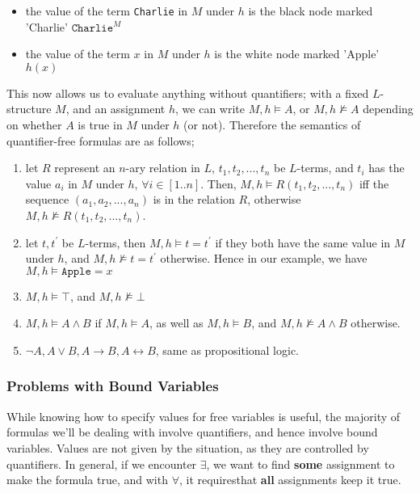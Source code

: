 \documentclass[a4paper, 12pt]{article}
\begin{document}
                \begin{itemize}
                    \itemsep0em
                    \item the value of the term \texttt{Charlie} in $M$ under $h$ is the black node marked 'Charlie' \hfill $\texttt{Charlie}^M$
                    \item the value of the term $x$ in $M$ under $h$ is the white node marked 'Apple' \hfill $h(x)$
                \end{itemize}
                This now allows us to evaluate anything without quantifiers; with a fixed $L$-structure $M$, and an assignment $h$, we can write $M, h \vDash A$, or $M, h \nvDash A$ depending on whether $A$ is true in $M$ under $h$ (or not). Therefore the semantics of quantifier-free formulas are as follows;
                \begin{enumerate}[1.]
                    \itemsep0em
                    \item let $R$ represent an $n$-ary relation in $L$, $t_1, t_2, ..., t_n$ be $L$-terms, and $t_i$ has the value $a_i$ in $M$ under $h$, $\forall i \in [1..n]$. Then, $M, h \vDash R(t_1, t_2, ..., t_n)$ iff the sequence $(a_1, a_2, ..., a_n)$ is in the relation $R$, otherwise $M, h \nvDash R(t_1, t_2, ..., t_n)$.
                    \item let $t, t^\prime$ be $L$-terms, then $M, h \vDash t = t^\prime$ if they both have the same value in $M$ under $h$, and $M, h \nvDash t = t^\prime$ otherwise.
                        \subitem Hence in our example, we have $M, h \vDash \texttt{Apple} = x$
                    \item $M, h \vDash \top$, and $M,h \nvDash \bot$
                    \item $M, h \vDash A \land B$ if $M, h \vDash A$, as well as $M, h \vDash B$, and $M, h \nvDash A \land B$ otherwise.
                    \item $\neg A, A \lor B, A \rightarrow B, A \leftrightarrow B$, same as propositional logic.
                \end{enumerate}
            \subsubsection*{Problems with Bound Variables}
                While knowing how to specify values for free variables is useful, the majority of formulas we'll be dealing with involve quantifiers, and hence involve bound variables. Values are not given by the situation, as they are controlled by quantifiers. In general, if we encounter $\exists$, we want to find \textbf{some} assignment to make the formula true, and with $\forall$, it requiresthat \textbf{all} assignments keep it true.
                \medskip
\end{document}
